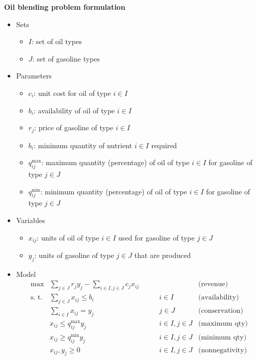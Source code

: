 \highspace
\begin{flushleft}
    \textcolor{Green3}{ \textbf{Oil blending problem formulation}}
\end{flushleft}
\begin{itemize}
    \item Sets
    \begin{itemize}
        \item $I$: set of oil types
        \item $J$: set of gasoline types
    \end{itemize}

    \item Parameters
    \begin{itemize}
        \item $c_i$: unit cost for oil of type $i \in I$ 
        \item $b_i$: availability of oil of type $i \in I$
        \item $r_j$: price of gasoline of type $i \in I$
        \item $b_i$: minimum quantity of nutrient $i \in I $ required
        \item $q_{ij}^{\max}$: maximum quantity (percentage) of oil of type $i \in I$ for gasoline of type $j \in J$
        \item $q_{ij}^{\min}$: minimum quantity (percentage) of oil of type $i \in I$ for gasoline of type $j \in J$
    \end{itemize}

    \newpage

    \item Variables
    \begin{itemize}
        \item $x_{ij}$: units of oil of type $i \in I$ used for gasoline of type $j \in J$
        \item $y_j$: units of gasoline of type $j \in J$ that are produced
    \end{itemize}

    \item Model
    \begin{equation*}
        \begin{array}{llll}
            \max & \displaystyle\sum_{j \in J}r_j y_j-\displaystyle\sum_{i \in I,j\in J} c_{j} x_{ij} \qquad & & \text{(revenue)} \\ [1.5em]
            \textrm{s. t.} & \displaystyle\sum_{j \in J}x_{ij} \leq b_i & i \in I & \text{(availability)} \\ [1.5em]
            & \displaystyle\sum_{i \in I}x_{ij}  = y_j & j \in J & \text{(conservation)} \\ [1.4em]
            & x_{ij} \leq q_{ij}^{\max}y_j & i \in I, j \in J & \text{(maximum qty)} \\ [.8em]
            & x_{ij} \geq q_{ij}^{\min}y_j & i \in I, j \in J & \text{(minimum qty)} \\ [.8em]
            & x_{ij},y_j \geq 0 &  i \in I,j \in J & \text{(nonnegativity)}
          \end{array}
    \end{equation*}
\end{itemize}

